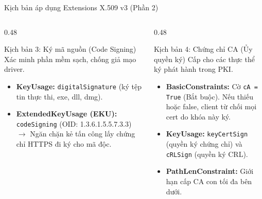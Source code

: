 \documentclass[10pt, aspectratio=169]{beamer}
\begin{document}
\begin{frame}{Kịch bản áp dụng Extensions X.509 v3 (Phần 2)}
    \begin{columns}[onlytextwidth]
        \begin{column}{0.48\textwidth}
            \begin{block}{Kịch bản 3: Ký mã nguồn (Code Signing)}
                Xác minh phần mềm sạch, chống giả mạo driver.
                \begin{itemize}
                    \item \textbf{KeyUsage:} \texttt{digitalSignature} (ký tệp tin thực thi, exe, dll, dmg).
                    \item \textbf{ExtendedKeyUsage (EKU):} \texttt{codeSigning} (OID: 1.3.6.1.5.5.7.3.3) $\rightarrow$ Ngăn chặn kẻ tấn công lấy chứng chỉ HTTPS đi ký cho mã độc.
                \end{itemize}
            \end{block}
        \end{column}
        \begin{column}{0.48\textwidth}
            \begin{block}{Kịch bản 4: Chứng chỉ CA (Ủy quyền ký)}
                Cấp cho các thực thể ký phát hành trong PKI.
                \begin{itemize}
                    \item \textbf{BasicConstraints:} Cờ \texttt{cA = True} (Bắt buộc). Nếu thiếu hoặc false, client từ chối mọi cert do khóa này ký.
                    \item \textbf{KeyUsage:} \texttt{keyCertSign} (quyền ký chứng chỉ) và \texttt{cRLSign} (quyền ký CRL).
                    \item \textbf{PathLenConstraint:} Giới hạn cấp CA con tối đa bên dưới.
                \end{itemize}
            \end{block}
        \end{column}
    \end{columns}
\end{frame}
\end{document}
